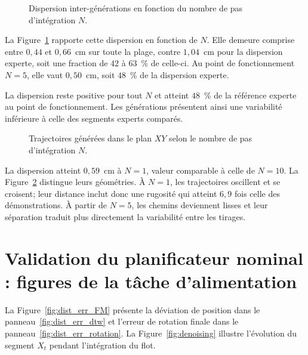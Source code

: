 \begin{figure}[!htbp]
    \centering
    
    \caption{Dispersion inter-générations en fonction du nombre de pas d'intégration $N$.}\label{fig:fm_dispersion_vs_pas}
\end{figure}

La Figure~\ref{fig:fm_dispersion_vs_pas} rapporte cette dispersion en fonction de $N$. Elle demeure comprise entre $0{,}44$ et $0{,}66$~cm sur toute la plage, contre $1{,}04$~cm pour la dispersion experte, soit une fraction de $42$ à $63$~\% de celle-ci. Au point de fonctionnement $N=5$, elle vaut $0{,}50$~cm, soit $48$~\% de la dispersion experte.

La dispersion reste positive pour tout $N$ et atteint $48$~\% de la référence experte au point de fonctionnement. Les générations présentent ainsi une variabilité inférieure à celle des segments experts comparés.

\begin{figure}[!htbp]
    \centering
    
    \caption{Trajectoires générées dans le plan $XY$ selon le nombre de pas d'intégration $N$.}\label{fig:fm_multimodalite_xy}
\end{figure}

La dispersion atteint $0{,}59$~cm à $N=1$, valeur comparable à celle de $N=10$. La Figure~\ref{fig:fm_multimodalite_xy} distingue leurs géométries. À $N=1$, les trajectoires oscillent et se croisent; leur distance inclut donc une rugosité qui atteint $6{,}9$ fois celle des démonstrations. À partir de $N=5$, les chemins deviennent lisses et leur séparation traduit plus directement la variabilité entre les tirages.

\section*{Validation du planificateur nominal : figures de la tâche d'alimentation}

La Figure~\ref{fig:dist_err_FM} présente la déviation de position dans le panneau~\ref{fig:dist_err_dtw} et l'erreur de rotation finale dans le panneau~\ref{fig:dist_err_rotation}. La Figure~\ref{fig:denoising} illustre l'évolution du segment $X_t$ pendant l'intégration du flot.


